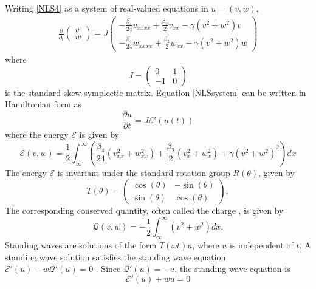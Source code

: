 \documentclass[12pt]{article}
\def\calE{{\mathcal E}}
\def\calQ{{\mathcal Q}}
\begin{document}
Writing \cref{NLS4} as a system of real-valued equations in $u = (v, w)$,
\begin{align}\label{NLSsystem}
\frac{\partial}{\partial_t}
\begin{pmatrix}v \\ w \end{pmatrix}
= J \begin{pmatrix}
-\frac{\beta_4}{24} v_{xxxx} + \frac{\beta_2}{2} v_{xx} - \gamma (v^2 + w^2)v \\
-\frac{\beta_4}{24} w_{xxxx} + \frac{\beta_2}{2} w_{xx} - \gamma (v^2 + w^2)w 
\end{pmatrix}
\end{align}
where 
\[
J = \begin{pmatrix}0 & 1 \\ -1 & 0 \end{pmatrix}
\]
is the standard skew-symplectic matrix. Equation \cref{NLSsystem} can be written in Hamiltonian form as 
\begin{equation}\label{NLSHam}
\frac{\partial u}{\partial t} = J \calE'(u(t))
\end{equation}
where the energy $\calE$ is given by
\begin{equation}\label{defH}
\calE(v, w) = \frac{1}{2} \int_{\infty}^\infty \left( \frac{\beta_4}{24}\left( v_{xx}^2 + w_{xx}^2 \right) + \frac{\beta_2}{2}\left( v_{x}^2 + w_{x}^2 \right) + \gamma \left(v^2 + w^2 \right)^2 \right) dx
\end{equation}
The energy $\mathcal{E}$ is invariant under the standard rotation group $R(\theta)$, given by
\begin{equation}\label{Rtheta}
T(\theta) = \begin{pmatrix}
\cos(\theta) & -\sin(\theta) \\
\sin(\theta)& \cos(\theta)
\end{pmatrix},
\end{equation}
The corresponding conserved quantity, often called the charge \cite[Section 6.C]{Grillakis1987}, is given by
\begin{equation}\label{defQ}
\mathcal{Q}(v, w) = -\frac{1}{2} \int_{\infty}^\infty \left( v^2 + w^2\right) dx.
\end{equation}
Standing waves are solutions of the form $T(\omega t) u$, where $u$ is independent of $t$. A standing wave solution satisfies the standing wave equation $\calE'(u) - w \calQ'(u) = 0$ \cite[2.15]{Grillakis1987}. Since $\calQ'(u) = -u$, the standing wave equation is
\begin{equation}\label{standingwaveeq}
\calE'(u) + w u = 0
\end{equation}
\end{document}
